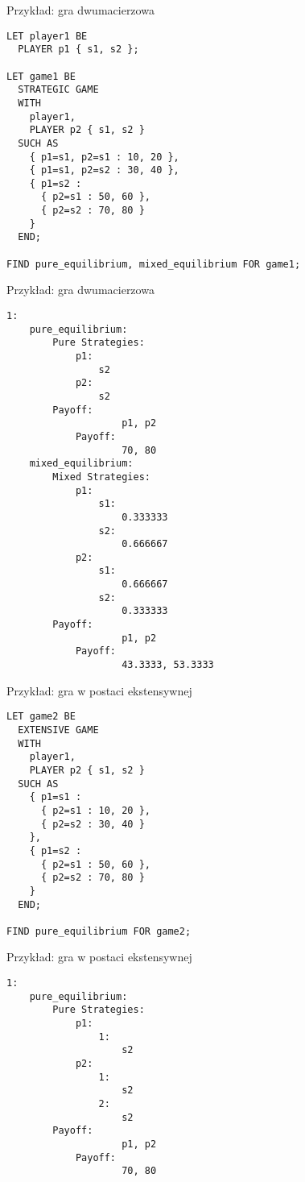\documentclass{beamer}
\begin{document}
\begin{frame}[fragile]{Przykład: gra dwumacierzowa}
\begin{lstlisting}
LET player1 BE
  PLAYER p1 { s1, s2 };

LET game1 BE
  STRATEGIC GAME
  WITH
    player1,
    PLAYER p2 { s1, s2 }
  SUCH AS
    { p1=s1, p2=s1 : 10, 20 },
    { p1=s1, p2=s2 : 30, 40 },
    { p1=s2 :
      { p2=s1 : 50, 60 },
      { p2=s2 : 70, 80 }
    }
  END;

FIND pure_equilibrium, mixed_equilibrium FOR game1;
\end{lstlisting}
\end{frame}

\begin{frame}[fragile]{Przykład: gra dwumacierzowa}
\begin{lstlisting}
1:
    pure_equilibrium:
        Pure Strategies:
            p1:
                s2
            p2:
                s2
        Payoff:
                    p1, p2
            Payoff:
                    70, 80
    mixed_equilibrium:
        Mixed Strategies:
            p1:
                s1:
                    0.333333
                s2:
                    0.666667
            p2:
                s1:
                    0.666667
                s2:
                    0.333333
        Payoff:
                    p1, p2
            Payoff:
                    43.3333, 53.3333
\end{lstlisting}
\end{frame}

\begin{frame}[fragile]{Przykład: gra w postaci ekstensywnej}
\begin{lstlisting}
LET game2 BE
  EXTENSIVE GAME
  WITH
    player1,
    PLAYER p2 { s1, s2 }
  SUCH AS
    { p1=s1 :
      { p2=s1 : 10, 20 },
      { p2=s2 : 30, 40 }
    },
    { p1=s2 :
      { p2=s1 : 50, 60 },
      { p2=s2 : 70, 80 }
    }
  END;

FIND pure_equilibrium FOR game2;
\end{lstlisting}
\end{frame}

\begin{frame}[fragile]{Przykład: gra w postaci ekstensywnej}
\begin{lstlisting}
1:
    pure_equilibrium:
        Pure Strategies:
            p1:
                1:
                    s2
            p2:
                1:
                    s2
                2:
                    s2
        Payoff:
                    p1, p2
            Payoff:
                    70, 80
\end{lstlisting}
\end{frame}
\end{document}
